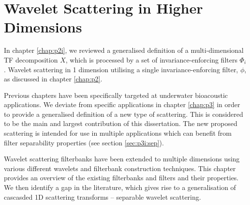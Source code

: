 \chapter{Wavelet Scattering in Higher Dimensions}
\label{chap:p3i}

In chapter \ref*{chap:p2i}, we reviewed a generalised definition of a multi-dimensional TF decomposition $X$, which is processed by a set of invariance-enforcing filters $\Phi_i$. Wavelet scattering in 1 dimension utilising a single invariance-enforcing filter, $\phi$, as discussed in chapter \ref*{chap:p2}.

Previous chapters have been specifically targeted at underwater bioacoustic applications. We deviate from specific applications in chapter \ref*{chap:p3} in order to provide a generalised definition of a new type of scattering. This is considered to be the main and largest contribution of this dissertation. The new proposed scattering is intended for use in multiple applications which can benefit from filter separability properties (see section \ref*{sec:p3i:sep}).

Wavelet scattering filterbanks have been extended to multiple dimensions using various different wavelets and filterbank construction techniques. This chapter provides an overview of the existing filterbanks and filters and their properties. We then identify a gap in the literature, which gives rise to a generalisation of cascasded 1D scattering transforms -- separable wavelet scattering.

